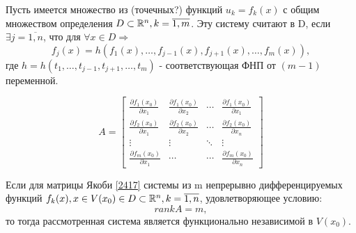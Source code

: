 \begin{definition}
    Пусть имеется множество из (точечных?) функций $u_k = f_k(x)$ с общим множеством определения $D \subset \mathbb{R}^n, k = \overline{1, m}$. Эту систему считают  в D, если $\exists j = \overline{1,n}$, что для $\forall x \in D \Rightarrow$
    \begin{equation}
    \label{2416}
    f_j (x) = h (f_1(x), \ldots, f_{j-1}(x), f_{j+1}(x), \ldots, f_m(x)), 
    \end{equation}
    где $h = h(t_1, \ldots, t_{j-1}, t_{j+1}, \ldots, t_m)$ - соответствующая ФНП от $(m-1)$ переменной.
\end{definition}
\begin{equation}
\label{2417}
A =  \begin{bmatrix}
\frac{\partial f_1(x_0)}{\partial x_1} & \frac{\partial f_1(x_0)}{\partial x_2} & \cdots & \frac{\partial f_1(x_0)}{\partial x_1} \\
\frac{\partial f_2(x_0)}{\partial x_1} & \frac{\partial f_2(x_0)}{\partial x_2} & \cdots & \frac{\partial f_2(x_0)}{\partial x_n} \\
\vdots  & \vdots  & \ddots & \vdots  \\
\frac{\partial f_m(x_0)}{\partial x_1} & \cdots & \cdots &\frac{\partial f_m(x_0)}{\partial x_n}
\end{bmatrix}
\end{equation}
\begin{theorem}
    Если для матрицы Якоби \eqref{2417} системы из m непрерывно дифференцируемых функций $f_k (x), x \in V(x_0) \in D \subset \mathbb{R}^n, k = \overline{1,n}$, удовлетворяющее условию:
    \begin{equation}
    \label{2418}
    rank A = m,
    \end{equation}
    то тогда рассмотренная система является функционально независимой в $V(x_0)$.
\end{theorem}
